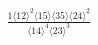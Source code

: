 \documentclass[varwidth, border=5pt]{standalone}
\begin{document}
\begin{my}
$\begin{gathered}
\scriptscriptstyle\frac{1⟨12⟩^2⟨15⟩⟨35⟩⟨24⟩^2}{⟨14⟩^4⟨23⟩^3}
\end{gathered}$
\end{my}
\end{document}

